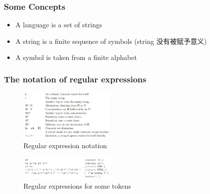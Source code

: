 \subsubsection{Some Concepts}
\begin{itemize}
    \item A language is a set of strings
    \item A string is a finite sequence of symbols (string 没有被赋予意义)
    \item A symbol is taken from a finite alphabet
\end{itemize}

\subsubsection{The notation of regular expressions}

\begin{figure}[!htb]
    \centering
    \includegraphics[width=0.42\textwidth]{pic/CP2/Regular expression notation}
    \caption{Regular expression notation}
\end{figure}

\begin{figure}[!htb]
    \centering
    \includegraphics[width=0.42\textwidth]{pic/CP2/Regular expressions for some tokens}
    \caption{Regular expressions for some tokens}
\end{figure}

